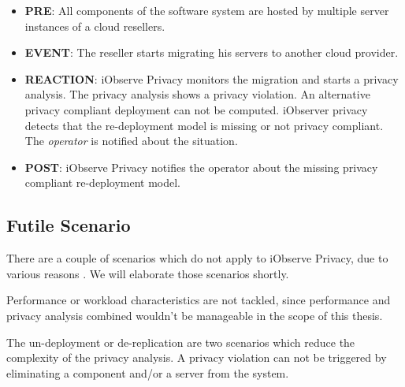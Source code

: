 \begin{itemize}
	\setlength\itemsep{0em}
	\item \textbf{PRE}: All components of the software system are hosted by multiple server instances of a cloud resellers. 
	\item \textbf{EVENT}: The reseller starts migrating his servers to another cloud provider.
	\item \textbf{REACTION}: iObserve Privacy monitors the migration and starts a privacy analysis. The privacy analysis shows a privacy violation. An alternative privacy compliant deployment can not be computed. iObserver privacy detects that the re-deployment model is missing or not privacy compliant. The \textit{operator} is notified about the situation.
	\item \textbf{POST}: iObserve Privacy notifies the operator about the missing privacy compliant re-deployment model.
\end{itemize}


\subsection{Futile Scenario}
\label{eval:scenario:futile}
There are a couple of scenarios which do not apply to iObserve Privacy, due to various reasons \cite{Heinrich.2016b}. We will elaborate those scenarios shortly.

Performance or workload characteristics are not tackled, since performance and privacy analysis combined wouldn't be manageable in the scope of this thesis.

The un-deployment or de-replication are two scenarios which reduce the complexity of the privacy analysis. A privacy violation can not be triggered by eliminating a component and/or a server from the system.


